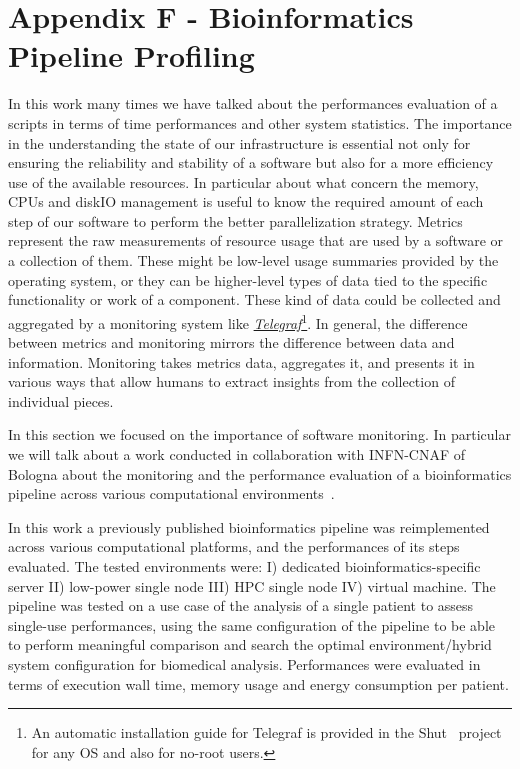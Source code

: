 \documentclass{standalone}
\begin{document}
\chapter*{Appendix F - Bioinformatics Pipeline Profiling}

In this work many times we have talked about the performances evaluation of a scripts in terms of time performances and other system statistics.
The importance in the understanding the state of our infrastructure is essential not only for ensuring the reliability and stability of a software but also for a more efficiency use of the available resources.
In particular about what concern the memory, CPUs and diskIO management is useful to know the required amount of each step of our software to perform the better parallelization strategy.
Metrics represent the raw measurements of resource usage that are used by a software or a collection of them.
These might be low-level usage summaries provided by the operating system, or they can be higher-level types of data tied to the specific functionality or work of a component.
These kind of data could be collected and aggregated by a monitoring system like \href{https://github.com/influxdata/telegraf}{\emph{Telegraf}}\footnote{
  An automatic installation guide for Telegraf is provided in the Shut~\cite{Shut} project for any OS and also for no-root users.
}.
In general, the difference between metrics and monitoring mirrors the difference between data and information.
Monitoring takes metrics data, aggregates it, and presents it in various ways that allow humans to extract insights from the collection of individual pieces.

In this section we focused on the importance of software monitoring.
In particular we will talk about a work conducted in collaboration with INFN-CNAF of Bologna about the monitoring and the performance evaluation of a bioinformatics pipeline across various computational environments~\cite{EuroPar2018}.

In this work a previously published bioinformatics pipeline was reimplemented across various computational platforms, and the performances of its steps evaluated.
The tested environments were:
I) dedicated bioinformatics-specific server
II) low-power single node
III) HPC single node
IV) virtual machine.
The pipeline was tested on a use case of the analysis of a single patient to assess single-use performances, using the same configuration of the pipeline to be able to perform meaningful comparison and search the optimal environment/hybrid system configuration for biomedical analysis.
Performances were evaluated in terms of execution wall time, memory usage and energy consumption per patient.
\end{document}
